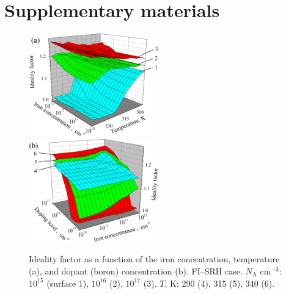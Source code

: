 \documentclass [sort&compress] {elsarticle}
\begin{document}
\section*{Supplementary materials}


\begin{figure}
\includegraphics[width=0.5\textwidth]{FigS1a}%
\includegraphics[width=0.5\textwidth]{FigS1b}
\caption{\label{figS1}
Ideality factor as a function of the iron concentration, temperature (a), and dopant (boron) concentration (b).
FI--SRH case.
$N_\mathrm{A}$ cm$^{-3}$: $10^{15}$ (surface 1), $10^{16}$ (2), $10^{17}$ (3).
$T$, K: 290 (4), 315 (5), 340 (6).
}%
\end{figure}
\end{document}
